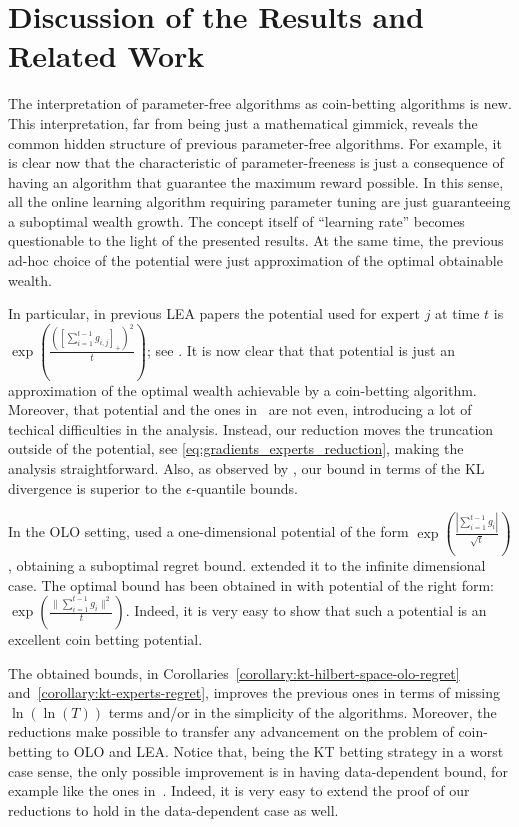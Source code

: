 \section{Discussion of the Results and Related Work}
\label{sec:discussion}

The interpretation of parameter-free algorithms as coin-betting algorithms is
new. This interpretation, far from being just a mathematical gimmick, reveals
the common hidden structure of previous parameter-free algorithms. For example,
it is clear now that the characteristic of parameter-freeness is just a
consequence of having an algorithm that guarantee the maximum reward possible.
In this sense, all the online learning algorithm requiring parameter tuning are
just guaranteeing a suboptimal wealth growth. The concept itself of ``learning rate'' becomes questionable to the light of the presented results.
At the same time, the previous
ad-hoc choice of the potential were just approximation of the optimal obtainable
wealth.

In particular, in previous \ac{LEA} papers the potential used for expert $j$ at
time $t$ is $\exp \left(\frac{([\sum_{i=1}^{t-1} g_{i,j}]_+)^2}{t}
\right)$; see \citep{ChaudhuriYH09,LuoE14,LuoS15}. It is now clear that
that potential is just an approximation of the optimal wealth achievable by a
coin-betting algorithm. Moreover, that potential and the ones
in~\citet{ChernovV10,KoolenE15} are not even, introducing a lot of techical
difficulties in the analysis. Instead, our reduction moves the truncation
outside of the potential, see \eqref{eq:gradients_experts_reduction}, making the
analysis straightforward. Also, as observed by \citet{ChernovV10}, our bound in
terms of the KL divergence is superior to the $\epsilon$-quantile bounds.

In the \ac{OLO} setting, \citet{StreeterM12} used a one-dimensional potential of
the form $\exp \left(\frac{|\sum_{i=1}^{t-1}
g_{i}|}{\sqrt{t}}\right)$, obtaining a suboptimal regret bound.
\citet{Orabona13} extended it to the infinite dimensional case. The optimal
bound has been obtained in \citet{McMahanO14} with potential of the right form:
$\exp \left(\frac{\|\sum_{i=1}^{t-1}
g_{i}\|^2}{t}\right)$. Indeed, it is very easy to show that such a
potential is an excellent coin betting potential.

The obtained bounds, in Corollaries~\ref{corollary:kt-hilbert-space-olo-regret}
and~\ref{corollary:kt-experts-regret}, improves the previous ones in terms of
missing $\ln(\ln(T))$ terms and/or in the simplicity of the algorithms. Moreover, the
reductions make possible to transfer any advancement on the problem of
coin-betting to \ac{OLO} and \ac{LEA}. Notice that, being the \ac{KT} betting
strategy in a worst case sense, the only possible improvement is in having
data-dependent bound, for example like the ones in~\cite{KoolenE15}. Indeed, it
is very easy to extend the proof of our reductions to hold in the data-dependent
case as well.

